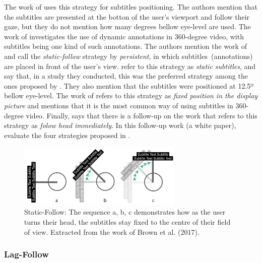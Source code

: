 The work of  uses this strategy for subtitles positioning. The authors mention that the subtitles are presented at the botton of the user's viewport and follow their gaze, but they do not mention how many degrees bellow eye-level are used. The work of  investigates the use of dynamic annotations in 360-degree video, with subtitles being one kind of such annotations. The authors mention the work of  and call the \emph{static-follow} strategy by \emph{persistent}, in which subtitles~(annotations) are placed in front of the user's view.  refer to this strategy as \emph{static subtitles}, and say that, in a study they conducted, this was the preferred strategy among the ones proposed by . They also mention that the subtitles were positioned at 12.5º bellow eye-level. The work of  refers to this strategy as \emph{fixed position in the display picture} and mentions that it is the most common way of using subtitles in 360-degree video. Finally,  says that there is a follow-up on the work  that refers to this strategy as \emph{folow head immediately}. In this follow-up work (a white paper),  evaluate the four strategies proposed in . %

\begin{figure}[!ht]
    \centering
    \includegraphics[width=0.7\textwidth]{img/static-follow.png}
    \caption{Static-Follow: The sequence a, b, c demonstrates how as the user turns their head, the subtitles stay fixed to the centre of their field of view. Extracted from the work of Brown et al. (2017).}
    \label{fig:static_follow}
\end{figure}




\subsubsection{Lag-Follow}
\label{subsubsec:lag_follow}

